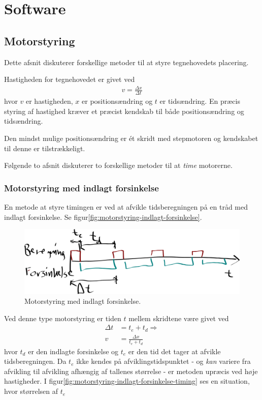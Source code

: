 \chapter[Design af software]{Software}



\section{Motorstyring}


Dette afsnit diskuterer forskellige metoder til at styre tegnehovedets
placering.

Hastigheden for tegnehovedet er givet ved
\begin{align}
  v = \frac{\Delta x}{\Delta t}
\end{align}
hvor $v$ er hastigheden, $x$ er positionsændring og $t$ er
tidsændring. En præcis styring af hastighed kræver et præcist kendskab
til både positionsændring og tidsændring.

Den mindst mulige positionsændring er ét skridt med
stepmotoren og kendskabet til denne er
tilstrækkeligt.

Følgende to afsnit diskuterer to forskellige metoder til at
\textit{time} motorerne.


\subsection{Motorstyring med indlagt forsinkelse}

En metode at styre timingen er ved at afvikle tidsberegningen på en
tråd med indlagt forsinkelse. Se
figur\vref{fig:motorstyring-indlagt-forsinkelse}.

\begin{figure}[htbp]
  \centering
  \includegraphics[width=.7\textwidth]{../brugere/kjaergaard/motorstyring-indlagt-forsinkelse}
  \caption{Motorstyring med indlagt forsinkelse.}
  \label{fig:motorstyring-indlagt-forsinkelse}
\end{figure}

Ved denne type motorstyring er tiden $t$ mellem
skridtene være givet ved
\begin{align}
  \Delta t &= t_e + t_d \nonumber \Rightarrow \\
  v &= \frac{\Delta x}{t_e + t_d}
\end{align}
hvor $t_d$ er den indlagte forsinkelse og $t_e$ er den tid det tager
at afvikle tidsberegningen. Da $t_e$ ikke kendes på
afviklingstidspunktet - og \textit{kan} variere fra afvikling til
afvikling afhængig af tallenes størrelse - er metoden upræcis ved høje
hastigheder. I figur\vref{fig:motorstyring-indlagt-forsinkelse-timing}
ses en situation, hvor størrelsen af $t_e$

